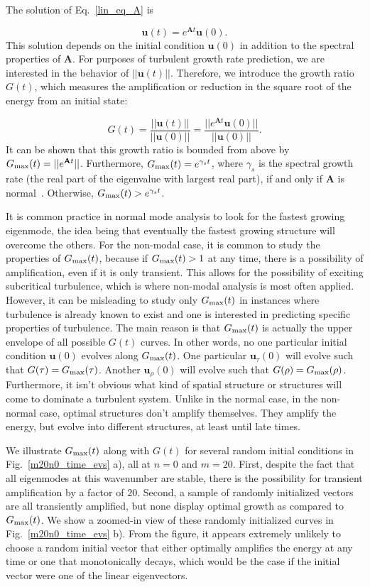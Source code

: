 \documentclass[showpacs,preprintnumbers,amsmath,amssymb,superscriptaddress,aip]{revtex4-1}
\def\beq{\begin{equation}}
\def\eeq{\end{equation}}
\begin{document}
The solution of Eq.~\ref{lin_eq_A} is

\beq
\label{lin_soln}
\mathbf{u}(t) = e^{\mathbf{A} t} \mathbf{u}(0).
\eeq
This solution depends on the initial condition $\mathbf{u}(0)$ in addition to the spectral properties of $\mathbf{A}$. For purposes of turbulent growth rate prediction, we are interested in
the behavior of $||\mathbf{u}(t)||$. Therefore, we introduce the growth ratio $G(t)$, which measures the amplification or reduction in the square root of the energy from an initial state:

\beq
\label{g_def}
G(t) = \frac{||\mathbf{u}(t)||}{||\mathbf{u}(0)||} = \frac{||e^{\mathbf{A} t} \mathbf{u}(0)||}{||\mathbf{u}(0)||}.
\eeq
It can be shown that this growth ratio is bounded from above by $G_{\rm{max}}(t) = ||e^{\mathbf{A} t}||$. Furthermore, $G_{\rm{max}}(t) = e^{\gamma_s t}$, where $\gamma_s$ is the spectral growth rate
(the real part of the eigenvalue with largest real part), if and only if $\mathbf{A}$ is normal~\cite{schmid2007}. Otherwise, $G_{\rm{max}}(t) > e^{\gamma_s t}$. 

It is common practice in normal mode analysis to look for the fastest growing eigenmode, the idea being that eventually the fastest growing structure will overcome the others.
For the non-modal case, it is common to study the properties of $G_{\rm{max}}(t)$, because if $G_{\rm{max}}(t) > 1$ at any time, there is a possibility of amplification, even if it is only transient.
This allows for the possibility of exciting subcritical turbulence, which is where non-modal analysis is most often applied. 
However, it can be misleading to study only $G_{\rm{max}}(t)$ in instances where turbulence is already known to exist and one is interested in predicting specific properties of turbulence. 
The main reason is that $G_{\rm{max}}(t)$ is actually the upper envelope of all possible $G(t)$ curves. In other words, no one particular initial condition $\mathbf{u}(0)$ evolves along $G_{\rm{max}}(t)$. 
One particular $\mathbf{u}_\tau(0)$ will evolve such that  $G(\tau)= G_{\rm{max}}(\tau)$. Another $\mathbf{u}_\rho(0)$ will evolve such that $G(\rho)= G_{\rm{max}}(\rho)$. 
Furthermore, it isn't obvious what kind of spatial structure or structures will come to dominate a turbulent system. 
Unlike in the normal case, in the non-normal case, optimal structures don't amplify themselves. They amplify the energy, but evolve into different structures, at least until late times.

We illustrate $G_{\rm{max}}(t)$ along with $G(t)$ for several random initial conditions in Fig.~\ref{m20n0_time_evs} a), all at $n=0$ and $m=20$. First, despite the fact that all eigenmodes at this
wavenumber are stable, there is the possibility for transient amplification by a factor of $20$. Second, a sample of randomly initialized vectors are all transiently amplified, but none display
optimal growth as compared to $G_{\rm{max}}(t)$. We show a zoomed-in view of these randomly initialized curves in Fig.~\ref{m20n0_time_evs} b).
From the figure, it appears extremely unlikely to choose a random initial vector that either optimally amplifies the energy at any time or one that monotonically decays, which would be the case
if the initial vector were one of the linear eigenvectors. 
\end{document}
